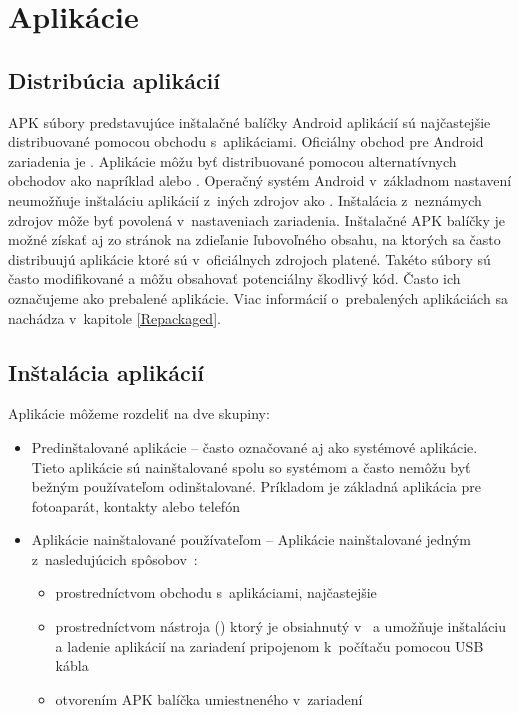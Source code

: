 \section{Aplikácie}
\subsection{Distribúcia aplikácií}

APK súbory predstavujúce inštalačné balíčky Android aplikácií sú najčastejšie distribuované pomocou obchodu s~aplikáciami. Oficiálny obchod pre Android zariadenia je . Aplikácie môžu byť distribuované pomocou alternatívnych obchodov ako napríklad  alebo . Operačný systém Android v~základnom nastavení neumožňuje inštaláciu aplikácií z~iných zdrojov ako . Inštalácia z~neznámych zdrojov môže byť povolená v~nastaveniach zariadenia. Inštalačné APK balíčky je možné získať aj zo stránok na zdieľanie ľubovoľného obsahu, na ktorých sa často distribuujú aplikácie ktoré sú v~oficiálnych zdrojoch platené. Takéto súbory sú často modifikované a môžu obsahovať potenciálny škodlivý kód. Často ich označujeme ako prebalené aplikácie. Viac informácií o~prebalených aplikáciách sa nachádza v~kapitole \ref{Repackaged}.

\subsection{Inštalácia aplikácií}
Aplikácie môžeme rozdeliť na dve skupiny:
\begin{itemize}
\item Predinštalované aplikácie – často označované aj ako systémové aplikácie. Tieto aplikácie sú nainštalované spolu so systémom a často nemôžu byť bežným používateľom odinštalované. Príkladom je základná aplikácia pre fotoaparát, kontakty alebo telefón
\item Aplikácie nainštalované používateľom – Aplikácie nainštalované jedným z~nasledujúcich spôsobov~\cite{Elenkov2015}:
\begin{itemize}
\item prostredníctvom obchodu s~aplikáciami, najčastejšie 
\item prostredníctvom nástroja  () ktorý je obsiahnutý v~ a umožňuje inštaláciu a ladenie aplikácií na zariadení pripojenom k~počítaču pomocou USB kábla
\item otvorením APK balíčka umiestneného v~zariadení
\end{itemize}
\end{itemize}

